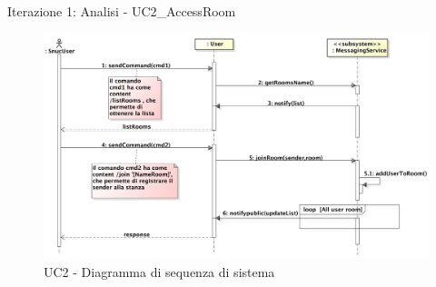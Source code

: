 \begin{frame} {Iterazione 1: Analisi - UC2\_AccessRoom}
   \begin{figure}
     \includegraphics[scale=0.20]{image_astah/Iteration_1_DomainModel/UC2_AccessRoom_SSD.png}{\centering}
     \caption{UC2 - Diagramma di sequenza di sistema}
     \label{fig_UC2_AR_SSD} 
   \end{figure}
\end{frame}

